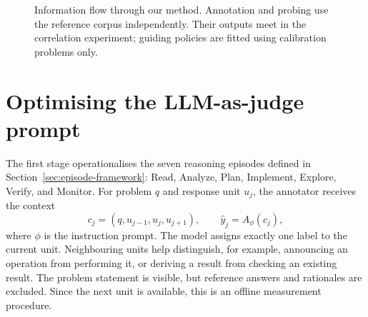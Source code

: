 \documentclass[12pt,a4paper,twoside,openright]{book}
\begin{document}
\begin{figure}[!ht]
  \centering
  \caption{Information flow through our method. Annotation and probing use
  the reference corpus independently. Their outputs meet in the correlation
  experiment; guiding policies are fitted using calibration problems only.}
  \label{fig:method-pipeline}
\end{figure}

\section{Optimising the LLM-as-judge prompt}
\label{sec:method-judge}

The first stage operationalises the seven reasoning episodes defined in
Section~\ref{sec:episode-framework}: Read, Analyze, Plan, Implement, Explore,
Verify, and Monitor. For problem $q$ and response unit $u_j$, the annotator
receives the context
\begin{equation}
  c_j=(q,u_{j-1},u_j,u_{j+1}), \qquad
  \widehat y_j=A_{\phi}(c_j),
\end{equation}
where $\phi$ is the instruction prompt. The model assigns exactly one label
to the current unit. Neighbouring units help distinguish, for example,
announcing an operation from performing it, or deriving a result from
checking an existing result. The problem statement is visible, but reference
answers and rationales are excluded. Since the next unit is available, this
is an offline measurement procedure.
\end{document}
